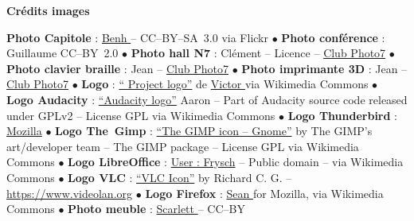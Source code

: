 
\vfill
\begin{center}
\textcolor{Cdl}{\textbf{Crédits images}} \par
{\tiny
 \textbf{Photo Capitole} : \href{https://www.flickr.com/photos/blieusong/6986608500/in/set-72157629942158013}{Benh } -- CC--BY--SA~3.0 via Flickr  \textcolor{Cdl}{$\bullet$}
 \textbf{Photo conférence } : Guillaume  CC--BY~2.0 \textcolor{Cdl}{$\bullet$}
 \textbf{Photo hall N7} : Clément  -- Licence  -- \href{https://photo7.inpt.fr/}{Club Photo7} \textcolor{Cdl}{$\bullet$}
 \textbf{Photo clavier braille} : Jean  -- \href{https://photo7.inpt.fr/}{Club Photo7} \textcolor{Cdl}{$\bullet$}
 \textbf{Photo imprimante 3D} : Jean  -- \href{https://photo7.inpt.fr/}{Club Photo7} \textcolor{Cdl}{$\bullet$}
 \textbf{Logo } : \href{https://commons.wikimedia.org/wiki/File\%3AOfficial_gnu.svg}{“ Project logo”} de \href{mailto:vcopovi@wanadoo.fr}{Victor } via Wikimedia Commons \textcolor{Cdl}{$\bullet$}
 \textbf{Logo Audacity} : \href{https://commons.wikimedia.org/wiki/File:Audacity_Logo.svg#/media/File:Audacity_Logo.svg}{“Audacity logo”} Aaron  -- Part of Audacity source code released under GPLv2 -- License GPL via Wikimedia Commons \textcolor{Cdl}{$\bullet$}
 \textbf{Logo Thunderbird} : \href{}{Mozilla} \textcolor{Cdl}{$\bullet$}
 \textbf{Logo The~Gimp} : \href{https://commons.wikimedia.org/wiki/File:The_GIMP_icon_-_gnome.svg#/media/File:The_GIMP_icon_-_gnome.svg}{“The GIMP icon -- Gnome”} by The GIMP’s art/developer team -- The GIMP package -- License GPL via Wikimedia Commons \textcolor{Cdl}{$\bullet$}
 \textbf{Logo LibreOffice} : \href{https://commons.wikimedia.org/wiki/File\%3ALogo-libreoffice.svg}{User : Frysch} -- Public domain -- via Wikimedia Commons \textcolor{Cdl}{$\bullet$}
 \textbf{Logo VLC} : \href{https://commons.wikimedia.org/wiki/File:VLC_Icon.svg#/media/File:VLC_Icon.svg}{“VLC Icon”} by Richard C. G.  -- \url{https://www.videolan.org} \textcolor{Cdl}{$\bullet$}
 \textbf{Logo Firefox} : \href{https://commons.wikimedia.org/wiki/File\%3AMozilla_Firefox_logo_2013.svg}{Sean } for Mozilla, via Wikimedia Commons \textcolor{Cdl}{$\bullet$}
 \textbf{Photo meuble} : \href{https://www.opendesk.cc/fin/fin-lockers}{Scarlett } -- CC--BY

}
\end{center}
